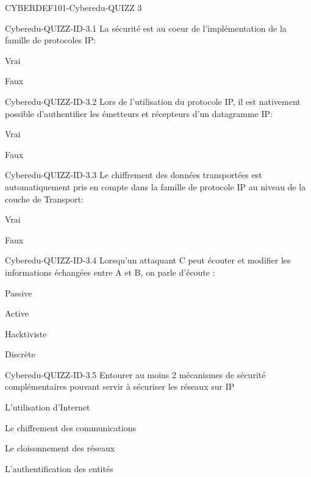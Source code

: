 \documentclass[12pt]{article}
\begin{document}
   \begin{quiz}{CYBERDEF101-Cyberedu-QUIZZ 3}


\begin{multi}[multiple=true]{Cyberedu-QUIZZ-ID-3.1}
	La s\'ecurit\'e est au coeur de l'impl\'ementation de la famille de protocoles IP:
\item Vrai
\item* Faux
\end{multi}
\begin{multi}[multiple=true]{Cyberedu-QUIZZ-ID-3.2}
	Lors de l'utilisation du protocole IP, il est nativement possible d'authentifier les \'emetteurs et r\'ecepteurs d'un datagramme IP:
\item Vrai
\item* Faux
\end{multi}
\begin{multi}[multiple=true]{Cyberedu-QUIZZ-ID-3.3}
	Le chiffrement des donn\'ees transport\'ees est automatiquement pris en compte dans la famille de protocole IP au niveau de la couche de Transport:
\item Vrai
\item* Faux
\end{multi}
\begin{multi}[multiple=true]{Cyberedu-QUIZZ-ID-3.4}
	Lorsqu'un attaquant C peut \'ecouter et modifier les informations \'echang\'ees entre A et B, on parle d'\'ecoute  :
\item Passive
\item* Active
\item Hacktiviste
\item Discr\`ete
\end{multi}
\begin{multi}[multiple=true]{Cyberedu-QUIZZ-ID-3.5}
	Entourer au moins 2 m\'ecanismes de s\'ecurit\'e compl\'ementaires pouvant servir \`{a} s\'ecuriser les r\'eseaux sur IP
\item L'utilisation d'Internet
\item* Le chiffrement des communications
\item* Le cloisonnement des r\'eseaux
\item* L'authentification des entit\'es
\end{multi}

\end{quiz}
\end{document}
